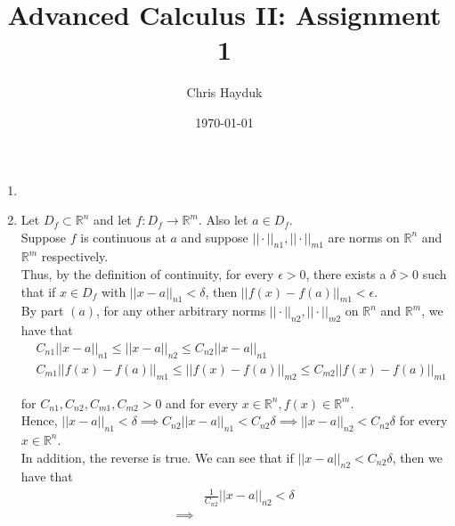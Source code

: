 \documentclass[12pt]{article}
\newenvironment{problem}[2][Problem]{\begin{trivlist}
\item[\hskip \labelsep {\bfseries #1}\hskip \labelsep {\bfseries #2.}]}{\end{trivlist}}
\begin{document}
\title{Advanced Calculus II: Assignment 1}

\author{Chris Hayduk}
\date{\today}

\maketitle

\begin{problem}{1}
\end{problem}

\begin{enumerate}[label=\alph*)]

\item 

\item Let $D_f \subset \mathbb{R}^n$ and let $f: D_f \to \mathbb{R}^m$. Also let $a \in D_f$.\\

Suppose $f$ is continuous at $a$ and suppose $|| \cdot ||_{n1}, || \cdot ||_{m1}$ are norms on $\mathbb{R}^n$ and $\mathbb{R}^m$ respectively.\\

Thus, by the definition of continuity, for every $\epsilon > 0$, there exists a $\delta > 0$ such that if $x \in D_f$ with $|| x - a ||_{n1} < \delta$, then $|| f(x) - f(a) ||_{m1} < \epsilon$.\\

By part $(a)$, for any other arbitrary norms $|| \cdot ||_{n2}, || \cdot ||_{m2}$ on $\mathbb{R}^n$ and $\mathbb{R}^m$, we have that
\begin{align*}
&C_{n1} || x - a ||_{n1} \leq || x - a ||_{n2} \leq C_{n2} || x - a ||_{n1}\\
&C_{m1} || f(x) - f(a) ||_{m1} \leq || f(x) - f(a) ||_{m2} \leq C_{m2} || f(x) - f(a) ||_{m1}
\end{align*}

for $C_{n1}, C_{n2}, C_{m1}, C_{m2} > 0$ and for every $x \in \mathbb{R}^n, f(x) \in \mathbb{R}^m$.\\

Hence, $|| x - a ||_{n1} < \delta \implies C_{n2} || x - a ||_{n1} < C_{n2} \delta \implies || x - a ||_{n2} < C_{n2} \delta$ for every $x \in \mathbb{R}^n$.\\

In addition, the reverse is true. We can see that if $|| x - a ||_{n2} < C_{n2} \delta$, then we have that 
\begin{align*}
&\frac{1}{C_{n2}} || x - a ||_{n2} < \delta\\
\implies &
\end{align*}

\end{enumerate}
\end{document}
